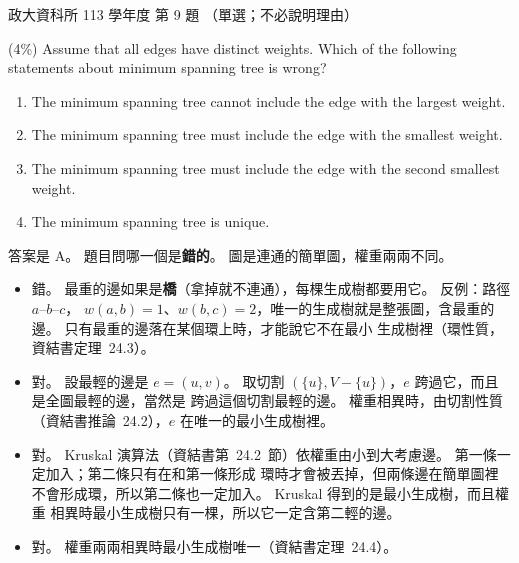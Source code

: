 \begin{pastexam}[label={px:nccu-113-dsa-09}]{政大資科所 113 學年度 第 9 題}
（單選；不必說明理由）

(4\%) Assume that all edges have distinct weights. Which of the following statements about minimum
spanning tree is wrong?
\begin{enumerate}[label=\Alph*.]
\item The minimum spanning tree cannot include the edge with the largest weight.
\item The minimum spanning tree must include the edge with the smallest weight.
\item The minimum spanning tree must include the edge with the second smallest weight.
\item The minimum spanning tree is unique.
\end{enumerate}
\end{pastexam}

\begin{pastsoln}
答案是 A。 題目問哪一個是\textbf{錯的}。 圖是連通的簡單圖，權重兩兩不同。

\begin{itemize}
\item[A.] 錯。 最重的邊如果是\textbf{橋}（拿掉就不連通），每棵生成樹都要用它。 反例：路徑 $a$--$b$--$c$，
$w(a,b) = 1$、$w(b,c) = 2$，唯一的生成樹就是整張圖，含最重的邊。 只有最重的邊落在某個環上時，才能說它不在最小
生成樹裡（環性質，資結書定理~24.3）。
\item[B.] 對。 設最輕的邊是 $e = (u, v)$。 取切割 $(\{u\}, V - \{u\})$，$e$ 跨過它，而且是全圖最輕的邊，當然是
跨過這個切割最輕的邊。 權重相異時，由切割性質（資結書推論~24.2），$e$ 在唯一的最小生成樹裡。
\item[C.] 對。 Kruskal 演算法（資結書第~24.2~節）依權重由小到大考慮邊。 第一條一定加入；第二條只有在和第一條形成
環時才會被丟掉，但兩條邊在簡單圖裡不會形成環，所以第二條也一定加入。 Kruskal 得到的是最小生成樹，而且權重
相異時最小生成樹只有一棵，所以它一定含第二輕的邊。
\item[D.] 對。 權重兩兩相異時最小生成樹唯一（資結書定理~24.4）。
\end{itemize}
\end{pastsoln}

